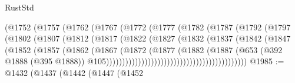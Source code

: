\begin{lexlean}{RustStd}
\begin{coremodule}
                                  (@1752
                                    (@1757
                                      (@1762
                                        (@1767
                                          (@1772
                                            (@1777
                                              (@1782
                                                (@1787
                                                  (@1792
                                                    (@1797
                                                      (@1802
                                                        (@1807
                                                          (@1812
                                                            (@1817
                                                              (@1822
                                                                (@1827
                                                                  (@1832
                                                                    (@1837
                                                                      (@1842
                                                                        (@1847
                                                                          (@1852
                                                                            (@1857
                                                                              (@1862
                                                                                (@1867
                                                                                  (@1872
                                                                                    (@1877
                                                                                      (@1882
                                                                                        (@1887
                                                                                          (@653
                                                                                            (@392
                                                                                              @1888
                                                                                              (@395
                                                                                                @1888))
                                                                                            @105))))))))))))))))))))))))))))))))))))))))))))
@1985 := @1432
    (@1437
      (@1442
        (@1447
          (@1452

\end{coremodule}
\end{lexlean}
